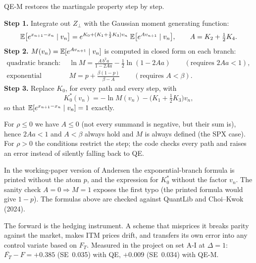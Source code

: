 QE-M restores the martingale property step by step.

\textbf{Step 1.} Integrate out $Z_\perp$ with the Gaussian moment generating function:
\[
\mathbb{E}\big[e^{x_{n+1}-x_n}\mid v_n\big]=e^{K_0+(K_1+\frac12K_3)v_n}\;\mathbb{E}\big[e^{Av_{n+1}}\mid v_n\big],
\qquad A=K_2+\tfrac12K_4 .
\]
\textbf{Step 2.} $M(v_n)=\mathbb{E}[e^{Av_{n+1}}\mid v_n]$ is computed in closed form on each branch:
\begin{align*}
\text{quadratic branch:}\quad&\ln M=\frac{A\,b^2a}{1-2Aa}-\tfrac12\ln(1-2Aa)\qquad(\text{requires }2Aa<1),\\
\text{exponential branch:}\quad&M=p+\frac{\beta(1-p)}{\beta-A}\qquad(\text{requires }A<\beta).
\end{align*}
\textbf{Step 3.} Replace $K_0$, for every path and every step, with
\begin{equation}\label{eq:qe-m}
K_0^*(v_n)=-\ln M(v_n)-\big(K_1+\tfrac12K_3\big)v_n,
\end{equation}
so that $\mathbb{E}[e^{x_{n+1}-x_n}\mid v_n]=1$ exactly.

For $\rho\le0$ we have $A\le0$ (not every summand is negative, but their sum is), hence $2Aa<1$ and $A<\beta$ always
hold and $M$ is always defined (the SPX case). For $\rho>0$ the conditions restrict the step; the code checks every
path and raises an error instead of silently falling back to QE.

\begin{attenzione}[title={Two typos in the source}]
In the working-paper version of Andersen the exponential-branch formula is printed without the atom $p$, and the
expression for $K_0^*$ without the factor $v_n$. The sanity check $A=0\Rightarrow M=1$ exposes the first typo (the
printed formula would give $1-p$). The formulas above are checked against QuantLib and Choi--Kwok (2024).
\end{attenzione}

\begin{perche}[title={Why the martingale property matters}]
The forward is the hedging instrument. A scheme that misprices it breaks parity against the market, makes ITM prices
drift, and transfers its own error into any control variate based on $F_T$. Measured in the project on set A-I at
$\Delta=1$: $\overline{F_T}-F=+0.385$ (SE~0.035) with QE, $+0.009$ (SE~0.034) with QE-M.
\end{perche}

